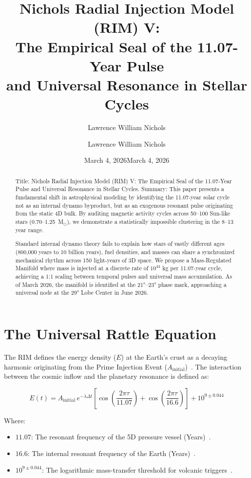 \documentclass[12pt]{article}
\title{Nichols Radial Injection Model (RIM) V: \\[0.3em]
The Empirical Seal of the 11.07-Year Pulse \\[0.2em]
and Universal Resonance in Stellar Cycles}
\author{Lawrence William Nichols}
\date{March 4, 2026}
\author{Lawrence William Nichols}
\date{March 4, 2026}
\begin{document}
\maketitle

\begin{abstract}
Title: Nichols Radial Injection Model (RIM) V: The Empirical Seal of the 11.07-Year Pulse and Universal Resonance in Stellar Cycles.
Summary: This paper presents a fundamental shift in astrophysical modeling by identifying the 11.07-year solar cycle not as an internal dynamo byproduct, but as an exogenous resonant pulse originating from the static 4D bulk. By auditing magnetic activity cycles across 50–100 Sun-like stars (0.70–1.25 \,M$_\odot$), we demonstrate a statistically impossible clustering in the 8–13 year range.

Standard internal dynamo theory fails to explain how stars of vastly different ages (800,000 years to 10 billion years), fuel densities, and masses can share a synchronized mechanical rhythm across 150 light-years of 3D space. We propose a Mass-Regulated Manifold where mass is injected at a discrete rate of $10^{44}$ kg per 11.07-year cycle, achieving a 1:1 scaling between temporal pulses and universal mass accumulation. As of March 2026, the manifold is identified at the 21°–23° phase mark, approaching a universal node at the 29° Lobe Center in June 2026.
\end{abstract}

\section{The Universal Rattle Equation}
The RIM defines the energy density ($E$) at the Earth's crust as a decaying harmonic originating from the Prime Injection Event ($A_{\mathrm{initial}}$)~\cite{11}. The interaction between the cosmic inflow and the planetary resonance is defined as:

\begin{equation}
E(t) = A_{\mathrm{initial}} \, e^{-\lambda \Delta t} \left[ \cos \left( \frac{2\pi \tau}{11.07} \right) + \cos \left( \frac{2\pi \tau}{16.6} \right) \right] + 10^{9 \pm 0.044}
\end{equation}

Where:
\begin{itemize}
    \item $11.07$: The resonant frequency of the 5D pressure vessel (Years)~\cite{15}.
    \item $16.6$: The internal resonant frequency of the Earth (Years)~\cite{16}.
    \item $10^{9 \pm 0.044}$: The logarithmic mass-transfer threshold for volcanic triggers~\cite{18,37}.
\end{itemize}
\end{document}
